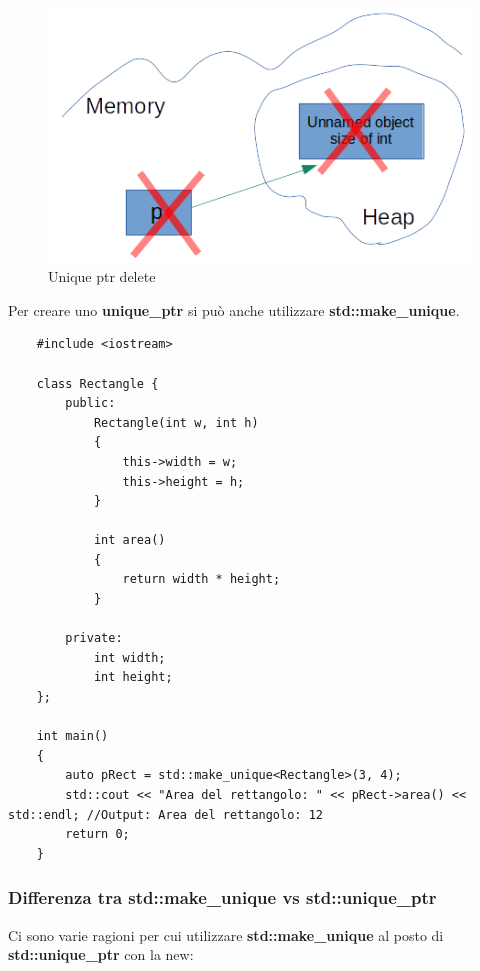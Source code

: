 \begin{figure}[H]
	\centering
	\includegraphics[width=1\textwidth, height=1\textheight, keepaspectratio]{./imgs/unique_ptr_delete.png}
	\caption{Unique ptr delete}
	\label{fig:unique_ptr_delete}
\end{figure}

\textsf{\small Per creare uno \textbf{unique\_ptr} si può anche utilizzare \textbf{std::make\_unique}.} \\

\begin{lstlisting}
	#include <iostream>
	
	class Rectangle {
		public:
			Rectangle(int w, int h)
			{
				this->width = w;
				this->height = h;
			}
		
			int area()
			{
				return width * height;
			}
		
		private:
			int width;
			int height;
	};

	int main()
	{
		auto pRect = std::make_unique<Rectangle>(3, 4);
		std::cout << "Area del rettangolo: " << pRect->area() << std::endl; //Output: Area del rettangolo: 12
		return 0;
	}
\end{lstlisting}

\subsubsection{Differenza tra std::make\_unique vs std::unique\_ptr}

\textsf{\small Ci sono varie ragioni per cui utilizzare \textbf{std::make\_unique} al posto di \textbf{std::unique\_ptr} con la new: } \\

